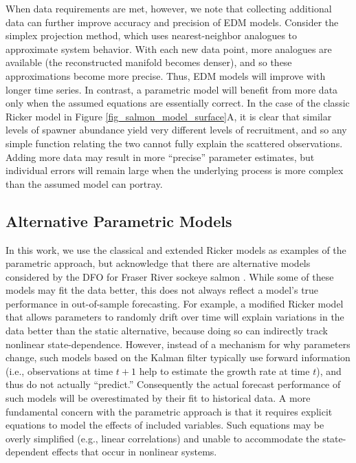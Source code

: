 When data requirements are met, however, we note that collecting additional data can further improve accuracy and precision of EDM models. Consider the simplex projection method, which uses nearest-neighbor analogues to approximate system behavior. With each new data point, more analogues are available (the reconstructed manifold becomes denser), and so these approximations become more precise. Thus, EDM models will improve with longer time series. In contrast, a parametric model will benefit from more data only when the assumed equations are essentially correct. In the case of the classic Ricker model in Figure \ref{fig_salmon_model_surface}A, it is clear that similar levels of spawner abundance yield very different levels of recruitment, and so any simple function relating the two cannot fully explain the scattered observations. Adding more data may result in more ``precise'' parameter estimates, but individual errors will remain large when the underlying process is more complex than the assumed model can portray.

\subsection{Alternative Parametric Models}

In this work, we use the classical and extended Ricker models as examples of the parametric approach, but acknowledge that there are alternative models considered by the DFO for Fraser River sockeye salmon \cite{Peterman_2000, Haeseker_2007, Haeseker_2008, Grant_2012}. While some of these models may fit the data better, this does not always reflect a model's true performance in out-of-sample forecasting. For example, a modified Ricker model that allows parameters to randomly drift over time \cite{Peterman_2000} will explain variations in the data better than the static alternative, because doing so can indirectly track nonlinear state-dependence. However, instead of a mechanism for why parameters change, such models based on the Kalman filter \cite{Kalman_1960} typically use forward information (i.e., observations at time $t+1$ help to estimate the growth rate at time $t$), and thus do not actually ``predict.'' Consequently the actual forecast performance of such models will be overestimated by their fit to historical data. A more fundamental concern with the parametric approach is that it requires explicit equations to model the effects of included variables. Such equations may be overly simplified (e.g., linear correlations) and unable to accommodate the state-dependent effects that occur in nonlinear systems.

